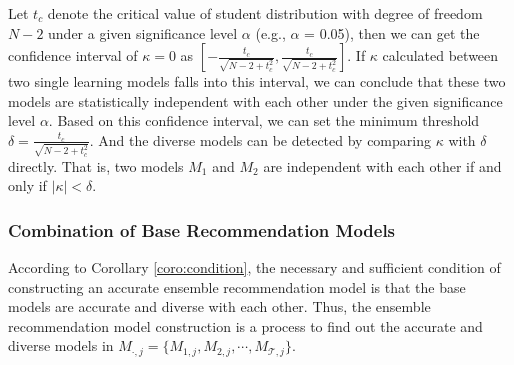 \documentclass[acmsmall]{acmart}
\begin{document}
Let $t_{c}$ denote the critical value of student distribution with
degree of freedom $N-2$ under a given significance level $\alpha$
(e.g., $\alpha$ = 0.05), then we can get the confidence interval of
$\kappa = 0$ as $[-\frac{t_c}{\sqrt{N - 2 + t_c^2}},
\frac{t_c}{\sqrt{N - 2 + t_c^2}}]$. If $\kappa$ calculated between
two single learning models falls into this interval, we can conclude
that these two models are statistically independent with each other
under the given significance level $\alpha$. Based on this
confidence interval, we can set the minimum threshold $\delta =
\frac{t_c}{\sqrt{N - 2 + t_c^2}}$. And the diverse models can be
detected by comparing $\kappa$ with $\delta$ directly. That is, two
models $M_1$ and $M_2$ are independent with each other if and only
if $|\kappa| < \delta$.

\subsubsection{Combination of Base Recommendation
	Models}\label{subsubsec:ensembleRecommendation}

According to Corollary \ref{coro:condition}, the necessary and
sufficient condition of constructing an accurate ensemble
recommendation model is that the base models are accurate and
diverse with each other. Thus, the ensemble recommendation model
construction is a process to find out the accurate and diverse
models in $M_{\cdot,j} = \{M_{1,j}, M_{2,j}, \cdots, M_{\mathcal{T},j}\}$.
\end{document}
